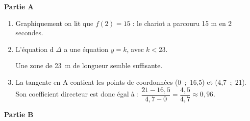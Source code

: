 \medskip

\begin{center}\textbf{Partie A} \end{center}

\begin{enumerate}
\item 
Graphiquement on lit que $f(2) = 15$ : le chariot a parcouru 15 m en 2 secondes.
\item 
L'équation d $\Delta$ a une équation $y = k$, avec $k < 23$.

Une zone de 23~m de longueur  semble suffisante.

\item 
La tangente en A contient les points de coordonnées (0~;~16,5) et (4,7~;~21). Son coefficient directeur est donc égal à : $\dfrac{21 - 16,5}{4,7 - 0} = \dfrac{4,5}{4,7} \approx 0,96$.
\end{enumerate}

\begin{center}\textbf{Partie B} \end{center}

